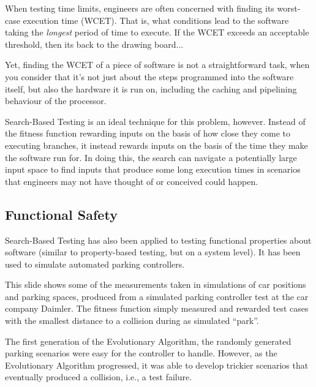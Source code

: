 When testing time limits, engineers are often concerned with finding its
worst-case execution time (WCET). That is, what conditions lead to the software
taking the {\it longest} period of time to execute. If the WCET exceeds an
acceptable threshold, then its back to the drawing board...

Yet, finding the WCET of a piece of software is not a straightforward task, when
you consider that it's not just about the steps programmed into the software
itself, but also the hardware it is run on, including the caching and pipelining
behaviour of the processor. 

Search-Based Testing is an ideal technique for this problem, however. Instead of
the fitness function rewarding inputs on the basis of how close they come to
executing branches, it instead rewards inputs on the basis of the time they make
the software run for. In doing this, the search can navigate a potentially large
input space to find inputs that produce some long execution times in scenarios
that engineers may not have thought of or conceived could happen.


\subsection{Functional Safety}

Search-Based Testing has also been applied to testing functional properties
about software (similar to property-based testing, but on a system level). It
has been used to simulate automated parking controllers. 



This slide shows some of the measurements taken in simulations of car positions
and parking spaces, produced from a simulated parking controller test at the car
company Daimler. The fitness function simply measured and rewarded test cases
with the smallest distance to a collision during as simulated ``park''. 


The first generation of the Evolutionary Algorithm, the randomly generated
parking scenarios were easy for the controller to handle. However, as the
Evolutionary Algorithm progressed, it was able to develop trickier scenarios
that eventually produced a collision, i.e., a test failure.


